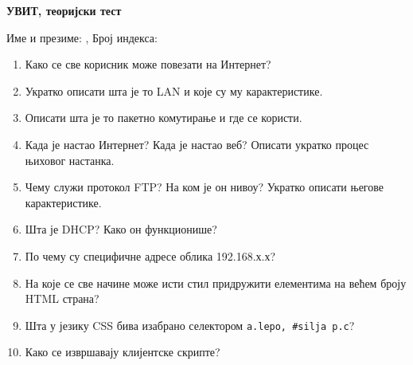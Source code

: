 \documentclass[a4paper]{article}
\begin{document}
\begin{center}
\textbf{УВИТ, теоријски тест}  
\end{center}
Име и презиме: \hrulefill, Број индекса: \hrulefill
\begin{enumerate}

\item Како се све корисник може повезати на Интернет? 

\hrulefill

\hrulefill

\hrulefill

\item Укратко описати шта је то LAN  и које су му карактеристике. 

\hrulefill

\hrulefill

\hrulefill

\item Описати шта је то пакетно комутирање и где се користи.

\hrulefill

\hrulefill

\hrulefill

\item Када је настао Интернет? Када је настао веб? Описати укратко процес њиховог настанка.

\hrulefill

\hrulefill

\hrulefill

\item Чему служи протокол FTP? На ком је он нивоу? Укратко описати његове карактеристике.

\hrulefill

\hrulefill

\hrulefill

\item Шта је DHCP? Како он функционише?

\hrulefill

\hrulefill

\hrulefill

\item По чему су специфичне адресе облика 192.168.х.х?  

\hrulefill

\hrulefill

\hrulefill

\item На које се све начине може исти стил придружити елементима на већем броју HTML страна?

\hrulefill

\hrulefill

\hrulefill

\item Шта у језику CSS бива изабрано селектором \verb|а.lepo, #silja p.c|?

\hrulefill

\hrulefill

\hrulefill

\item Како се извршавају клијентске скрипте?

\hrulefill

\hrulefill

\hrulefill


\end{enumerate}
\end{document}
